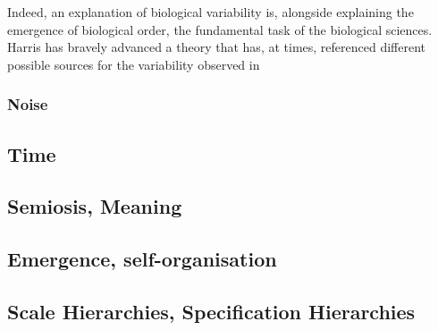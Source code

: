 Indeed, an explanation of biological variability is, alongside explaining the emergence of biological order, the fundamental task of the biological sciences. Harris has bravely advanced a theory that has, at times, referenced different possible sources for the variability observed in 

\subsubsection{Noise}

\subsection{Time}
\label{time}
\subsection{Semiosis, Meaning}
\label{semiosis}
\subsection{Emergence, self-organisation}
\label{emergence}
\subsection{Scale Hierarchies, Specification Hierarchies}
\label{hierarchy}
